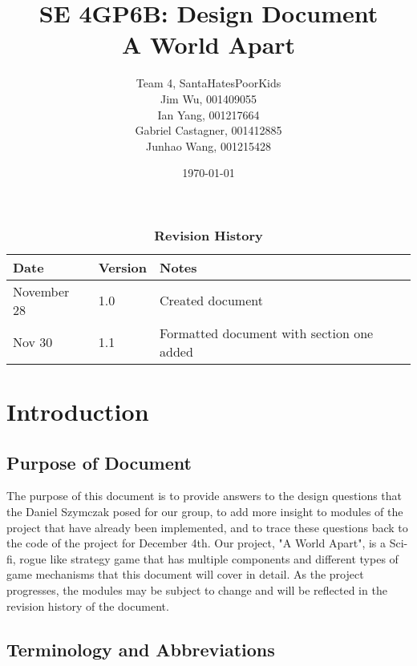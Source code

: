 \documentclass[12pt, titlepage]{article}
\title{SE 4GP6B: Design Document\\A World Apart}
\author{Team 4, SantaHatesPoorKids
		\\ Jim Wu, 001409055
		\\ Ian Yang, 001217664
		\\ Gabriel Castagner, 001412885
		\\ Junhao Wang, 001215428
}
\date{\today}
\begin{document}
\maketitle

\tableofcontents
\listoftables
\listoffigures

\begin{table}[bp]
\caption{\bf Revision History}
\begin{tabularx}{\textwidth}{p{3cm}p{2cm}X}
\toprule {\bf Date} & {\bf Version} & {\bf Notes}\\
\midrule
November 28 & 1.0 & Created document\\
Nov 30 & 1.1 & Formatted document with section one added\\

\bottomrule
\end{tabularx}
\end{table}

\newpage


\section{Introduction}
\subsection{Purpose of Document}
The purpose of this document is to provide answers to the design questions that the Daniel Szymczak posed for our group, to add more insight to modules of the project that have already been implemented, and to trace these questions back to the code of the project for December 4th.
Our project, "A World Apart", is a Sci-fi, rogue like strategy game that has multiple components and different types of game mechanisms that this document will cover in detail. As the project progresses, the modules may be subject to change and will be reflected in the revision history of the document.
\subsection{Terminology and Abbreviations}
\end{document}
